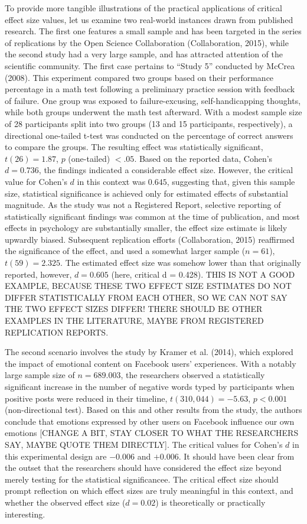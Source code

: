 \documentclass[
  man]{apa7}
\begin{document}
To provide more tangible illustrations of the practical applications of critical effect size values, let us examine two real-world instances drawn from published research. The first one features a small sample and has been targeted in the series of replications by the Open Science Collaboration (Collaboration, 2015), while the second study had a very large sample, and has attracted attention of the scientific community. The first case pertains to ``Study 5'' conducted by McCrea (2008). This experiment compared two groups based on their performance percentage in a math test following a preliminary practice session with feedback of failure. One group was exposed to failure-excusing, self-handicapping thoughts, while both groups underwent the math test afterward. With a modest sample size of 28 participants split into two groups (13 and 15 participants, respectively), a directional one-tailed t-test was conducted on the percentage of correct answers to compare the groups. The resulting effect was statistically significant, \(t(26) = 1.87\), \(p\) (one-tailed) \(< .05\). Based on the reported data, Cohen's \(d = 0.736\), the findings indicated a considerable effect size. However, the critical value for Cohen's \(d\) in this context was \(0.645\), suggesting that, given this sample size, statistical significance is achieved only for estimated effects of substantial magnitude. As the study was not a Registered Report, selective reporting of statistically significant findings was common at the time of publication, and most effects in psychology are substantially smaller, the effect size estimate is likely upwardly biased. Subsequent replication efforts (Collaboration, 2015) reaffirmed the significance of the effect, and used a somewhat larger sample (\(n = 61\)), \(t(59)=2.325\). The estimated effect size was somehow lower than that originally reported, however, \(d = 0.605\) (here, critical d = 0.428). THIS IS NOT A GOOD EXAMPLE, BECAUSE THESE TWO EFFECT SIZE ESTIMATES DO NOT DIFFER STATISTICALLY FROM EACH OTHER, SO WE CAN NOT SAY THE TWO EFFECT SIZES DIFFER! THERE SHOULD BE OTHER EXAMPLES IN THE LITERATURE, MAYBE FROM REGISTERED REPLICATION REPORTS.

The second scenario involves the study by Kramer et al. (2014), which explored the impact of emotional content on Facebook users' experiences. With a notably large sample size of \(n = 689.003\), the researchers observed a statistically significant increase in the number of negative words typed by participants when positive posts were reduced in their timeline, \(t(310,044) = −5.63\), \(p < 0.001\) (non-directional test). Based on this and other results from the study, the authors conclude that emotions expressed by other users on Facebook influence our own emotions {[}CHANGE A BIT, STAY CLOSER TO WHAT THE RESEARCHERS SAY, MAYBE QUOTE THEM DIRECTLY{]}. The critical values for Cohen's \(d\) in this experimental design are \(-0.006\) and \(+0.006\). It should have been clear from the outset that the researchers should have considered the effect size beyond merely testing for the statistical significancee. The critical effect size should prompt reflection on which effect sizes are truly meaningful in this context, and whether the observed effect size (\(d = 0.02\)) is theoretically or practically interesting.
\end{document}
